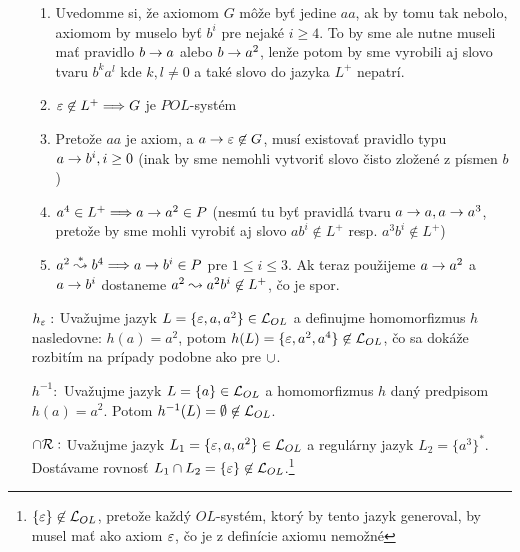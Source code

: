\begin{dokaz}
\begin{itemize}
        \begin{enumerate}
        \item Uvedomme si, že axiomom $G$ môže byť jedine $aa$, ak by tomu
            tak nebolo, axiomom by muselo byť $b^{i}$ pre nejaké $i\geq4$.
            To by sme ale nutne museli mať pravidlo $b\rightarrow a$ alebo 
            $b\rightarrow a^2$, lenže potom by sme vyrobili aj slovo tvaru 
            $b^k a^l$ kde  $k,l\neq0$ a  také slovo do jazyka $L^{+}$
            nepatrí. 

        \item $\varepsilon \not \in L^{+} \Longrightarrow G$ je $POL$-systém

        \item Pretože $aa$ je axiom, a $a \rightarrow \varepsilon \not \in G$,
            musí existovať pravidlo typu
            $a\rightarrow b^i, i\ge 0$ (inak by sme nemohli vytvoriť
            slovo čisto zložené z písmen $b$)

        \item $a^4 \in L^{+} \Longrightarrow a\rightarrow a^2\in P$ (nesmú tu byť
            pravidlá tvaru $a\rightarrow a,a\rightarrow a^3$,
            pretože by sme mohli vyrobiť
            aj slovo $ab^{i}\not\in L^{+}$ resp.
            $a^3b^i \not \in L^{+}$)

        \item $a^2 \overset{*}{\leadsto} b^4 \Longrightarrow a\rightarrow b^{i}\in P$ 
            pre $1\le i\le 3$. Ak teraz použijeme 
            $a\rightarrow a^2$ a $a\rightarrow b^{i}$ dostaneme 
            $a^2 \leadsto a^2 b^i \not\in L^{+}$, čo je spor.
        \end{enumerate}

    \item[$h_{\varepsilon}:$] Uvažujme jazyk
        $L=\{\varepsilon,a,a^2\}\in \mathcal{L}_{OL}$ a definujme
        homomorfizmus $h$ nasledovne: $h(a)=a^2$, potom
        $h(L)=\{\varepsilon,a^2,a^4\} \not \in \mathcal{L}_{OL}$, čo sa
        dokáže rozbitím na prípady podobne ako pre $\cup$.

    \item[$h^{-1}:$] Uvažujme jazyk $L=\{a\}\in \mathcal{L}_{OL}$ a
        homomorfizmus $h$ daný predpisom $h(a)=a^2$. Potom
        $h^{-1}(L)=\emptyset \not\in \mathcal{L}_{OL}$.

    \item[$\cap\mathcal{R} :$] Uvažujme jazyk
        $L_1=\{\varepsilon,a,a^2\} \in \mathcal{L}_{OL}$ a regulárny
        jazyk $L_2=\{a^3\}^{*}$.
        Dostávame rovnosť $L_1 \cap
        L_2 =\{\varepsilon\}\not\in \mathcal{L}_{OL}$.\footnote{
            $\{\varepsilon\}\not\in\mathcal{L}_{OL}$, pretože každý
            $OL$-systém, ktorý by tento jazyk generoval, by musel mať ako
            axiom $\varepsilon$, čo je z definície axiomu nemožné}
    \end{itemize}
\end{dokaz}

